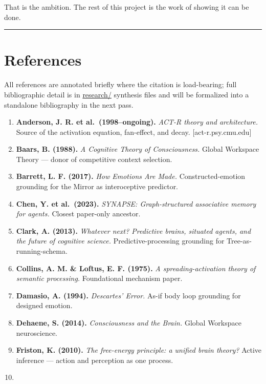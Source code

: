 \documentclass[12pt]{article}
\begin{document}
That is the ambition. The rest of this project is the work of showing it can be done.

\begin{center}\rule{0.5\linewidth}{0.5pt}\end{center}

\section{References}\label{references}

All references are annotated briefly where the citation is load-bearing; full bibliographic detail is in \href{../research/}{research/} synthesis files and will be formalized into a standalone bibliography in the next pass.

\begin{enumerate}
\def\labelenumi{\arabic{enumi}.}
\item
  \textbf{Anderson, J. R. et al.~(1998--ongoing).} \emph{ACT-R theory and architecture.} Source of the activation equation, fan-effect, and decay. {[}act-r.psy.cmu.edu{]}
\item
  \textbf{Baars, B. (1988).} \emph{A Cognitive Theory of Consciousness.} Global Workspace Theory --- donor of competitive context selection.
\item
  \textbf{Barrett, L. F. (2017).} \emph{How Emotions Are Made.} Constructed-emotion grounding for the Mirror as interoceptive predictor.
\item
  \textbf{Chen, Y. et al.~(2023).} \emph{SYNAPSE: Graph-structured associative memory for agents.} Closest paper-only ancestor.
\item
  \textbf{Clark, A. (2013).} \emph{Whatever next? Predictive brains, situated agents, and the future of cognitive science.} Predictive-processing grounding for Tree-as-running-schema.
\item
  \textbf{Collins, A. M. \& Loftus, E. F. (1975).} \emph{A spreading-activation theory of semantic processing.} Foundational mechanism paper.
\item
  \textbf{Damasio, A. (1994).} \emph{Descartes' Error.} As-if body loop grounding for designed emotion.
\item
  \textbf{Dehaene, S. (2014).} \emph{Consciousness and the Brain.} Global Workspace neuroscience.
\item
  \textbf{Friston, K. (2010).} \emph{The free-energy principle: a unified brain theory?} Active inference --- action and perception as one process.
\item

\end{enumerate}
\end{document}
